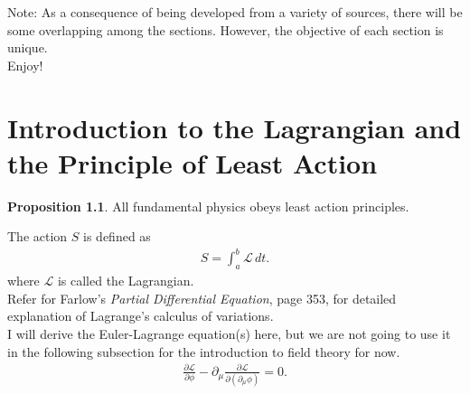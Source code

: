 \documentclass{book}
\numberwithin{equation}{section}
\theoremstyle{definition}
\newtheorem{prop}{Proposition}[section]
\begin{document}
Note: As a consequence of being developed from a variety of sources, there will be some overlapping among the sections. However, the objective of each section is unique.\\

Enjoy!


\newpage

\tableofcontents

\newpage
\chapter{Introduction to the Lagrangian and the Principle of Least Action}
\begin{prop}
	All fundamental physics obeys least action principles.
\end{prop}
The action $S$ is defined as
\begin{align}
S = \int_{a}^{b}\mathcal{L}\,dt.
\end{align}
where $\mathcal{L}$ is called the Lagrangian.\\

Refer for Farlow's \textit{Partial Differential Equation}, page 353, for detailed explanation of Lagrange's calculus of variations.\\

I will derive the Euler-Lagrange equation(s) here, but we are not going to use it in the following subsection for the introduction to field theory for now. \\
\begin{align}
\frac{\partial \mathcal{L}}{\partial \phi} - \partial_\mu\frac{\partial \mathcal{L}}{\partial(\partial_\mu \phi)} = 0.
\end{align}
\end{document}
